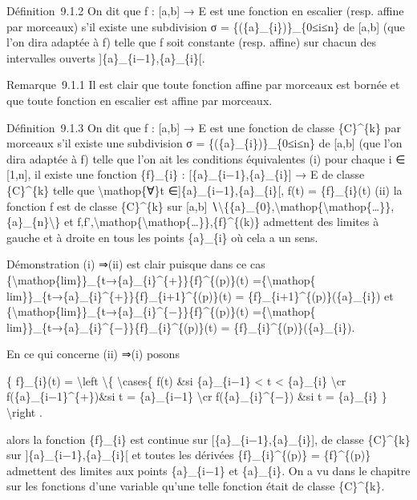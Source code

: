 \documentclass[]{article}
\begin{document}
Définition~9.1.2 On dit que f : {[}a,b{]} → E est une fonction en
escalier (resp. affine par morceaux) s'il existe une subdivision σ =
\{(\{a\}\_\{i\})\}\_\{0≤i≤n\} de {[}a,b{]} (que l'on dira adaptée à f)
telle que f soit constante (resp. affine) sur chacun des intervalles
ouverts {]}\{a\}\_\{i−1\},\{a\}\_\{i\}{[}.

Remarque~9.1.1 Il est clair que toute fonction affine par morceaux est
bornée et que toute fonction en escalier est affine par morceaux.

Définition~9.1.3 On dit que f : {[}a,b{]} → E est une fonction de classe
\{C\}\^{}\{k\} par morceaux s'il existe une subdivision σ =
\{(\{a\}\_\{i\})\}\_\{0≤i≤n\} de {[}a,b{]} (que l'on dira adaptée à f)
telle que l'on ait les conditions équivalentes (i) pour chaque i ∈
{[}1,n{]}, il existe une fonction \{f\}\_\{i\} :
{[}\{a\}\_\{i−1\},\{a\}\_\{i\}{]} → E de classe \{C\}\^{}\{k\} telle que
\textbackslash{}mathop\{∀\}t ∈{]}\{a\}\_\{i−1\},\{a\}\_\{i\}{[}, f(t) =
\{f\}\_\{i\}(t) (ii) la fonction f est de classe \{C\}\^{}\{k\} sur
{[}a,b{]}
∖\textbackslash{}\{\{a\}\_\{0\},\textbackslash{}mathop\{\textbackslash{}mathop\{\ldots{}\}\},\{a\}\_\{n\}\textbackslash{}\}
et
f,f',\textbackslash{}mathop\{\textbackslash{}mathop\{\ldots{}\}\},\{f\}\^{}\{(k)\}
admettent des limites à gauche et à droite en tous les points
\{a\}\_\{i\} où cela a un sens.

Démonstration (i) ⇒(ii) est clair puisque dans ce cas
\{\textbackslash{}mathop\{lim\}\}\_\{t→\{a\}\_\{i\}\^{}\{+\}\}\{f\}\^{}\{(p)\}(t)
=\{\textbackslash{}mathop\{
lim\}\}\_\{t→\{a\}\_\{i\}\^{}\{+\}\}\{f\}\_\{i+1\}\^{}\{(p)\}(t) =
\{f\}\_\{i+1\}\^{}\{(p)\}(\{a\}\_\{i\}) et
\{\textbackslash{}mathop\{lim\}\}\_\{t→\{a\}\_\{i\}\^{}\{−\}\}\{f\}\^{}\{(p)\}(t)
=\{\textbackslash{}mathop\{
lim\}\}\_\{t→\{a\}\_\{i\}\^{}\{−\}\}\{f\}\_\{i\}\^{}\{(p)\}(t) =
\{f\}\_\{i\}\^{}\{(p)\}(\{a\}\_\{i\}).

En ce qui concerne (ii) ⇒(i) posons

\{ f\}\_\{i\}(t) = \textbackslash{}left \textbackslash{}\{
\textbackslash{}cases\{ f(t) \&si \{a\}\_\{i−1\} \textless{} t
\textless{} \{a\}\_\{i\} \textbackslash{}cr
f(\{a\}\_\{i−1\}\^{}\{+\})\&si t = \{a\}\_\{i−1\} \textbackslash{}cr
f(\{a\}\_\{i\}\^{}\{−\}) \&si t = \{a\}\_\{i\} \} \textbackslash{}right
.

alors la fonction \{f\}\_\{i\} est continue sur
{[}\{a\}\_\{i−1\},\{a\}\_\{i\}{]}, de classe \{C\}\^{}\{k\} sur
{]}\{a\}\_\{i−1\},\{a\}\_\{i\}{[} et toutes les dérivées
\{f\}\_\{i\}\^{}\{(p)\} = \{f\}\^{}\{(p)\} admettent des limites aux
points \{a\}\_\{i−1\} et \{a\}\_\{i\}. On a vu dans le chapitre sur les
fonctions d'une variable qu'une telle fonction était de classe
\{C\}\^{}\{k\}.
\end{document}
